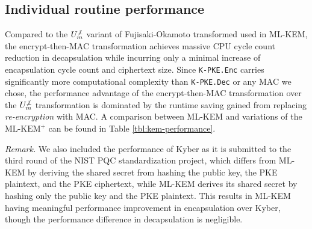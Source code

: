 \documentclass[journal=tches,submission]{iacrtrans}
\newcommand{\encrypt}{\texttt{Enc}}
\newcommand{\decrypt}{\texttt{Dec}}
\begin{document}
\subsection{Individual routine performance}
Compared to the $U^{\not\bot}_m$ variant of Fujisaki-Okamoto transformed used in ML-KEM, the encrypt-then-MAC transformation achieves massive CPU cycle count reduction in decapsulation while incurring only a minimal increase of encapsulation cycle count and ciphertext size. Since \texttt{K-PKE.\encrypt} carries significantly more computational complexity than \texttt{K-PKE.\decrypt} or any MAC we chose, the performance advantage of the encrypt-then-MAC transformation over the $U^{\not\bot}_m$ transformation is dominated by the runtime saving gained from replacing \emph{re-encryption} with MAC. A comparison between ML-KEM and variations of the $\text{ML-KEM}^+$ can be found in Table \ref{tbl:kem-performance}.

\emph{Remark.} We also included the performance of Kyber as it is submitted to the third round of the NIST PQC standardization project, which differs from ML-KEM by deriving the shared secret from hashing the public key, the PKE plaintext, and the PKE ciphertext, while ML-KEM derives its shared secret by hashing only the public key and the PKE plaintext. This results in ML-KEM having meaningful performance improvement in encapsulation over Kyber, though the performance difference in decapsulation is negligible.
\end{document}

